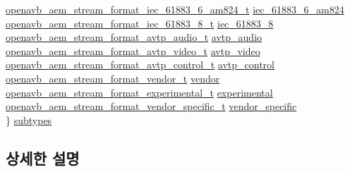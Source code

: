 \begin{DoxyCompactItemize}
\begin{tabbing}
\>\hyperlink{structopenavb__aem__stream__format__iec__61883__6__am824__t}{openavb\_aem\_stream\_format\_iec\_61883\_6\_am824\_t} \hyperlink{structopenavb__aem__stream__format__t_a6aeb7795fdcb65c756c3ccba977f1871}{iec\_61883\_6\_am824}\\
\>\hyperlink{structopenavb__aem__stream__format__iec__61883__8__t}{openavb\_aem\_stream\_format\_iec\_61883\_8\_t} \hyperlink{structopenavb__aem__stream__format__t_a5998a324f07307ce4d2f092b76ee670a}{iec\_61883\_8}\\
\>\hyperlink{structopenavb__aem__stream__format__avtp__audio__t}{openavb\_aem\_stream\_format\_avtp\_audio\_t} \hyperlink{structopenavb__aem__stream__format__t_a34c41241f596f9558c3bffc8598d2e00}{avtp\_audio}\\
\>\hyperlink{structopenavb__aem__stream__format__avtp__video__t}{openavb\_aem\_stream\_format\_avtp\_video\_t} \hyperlink{structopenavb__aem__stream__format__t_abd1432549c3dd07e3d987e44658f77bc}{avtp\_video}\\
\>\hyperlink{structopenavb__aem__stream__format__avtp__control__t}{openavb\_aem\_stream\_format\_avtp\_control\_t} \hyperlink{structopenavb__aem__stream__format__t_a37a91cf62d4d80f4fd05bc7b2a8c148a}{avtp\_control}\\
\>\hyperlink{structopenavb__aem__stream__format__vendor__t}{openavb\_aem\_stream\_format\_vendor\_t} \hyperlink{structopenavb__aem__stream__format__t_abe3fa7c528292c33e301ca728ad10258}{vendor}\\
\>\hyperlink{structopenavb__aem__stream__format__experimental__t}{openavb\_aem\_stream\_format\_experimental\_t} \hyperlink{structopenavb__aem__stream__format__t_a7d40af42829b920922cd5b33b5051f61}{experimental}\\
\>\hyperlink{structopenavb__aem__stream__format__vendor__specific__t}{openavb\_aem\_stream\_format\_vendor\_specific\_t} \hyperlink{structopenavb__aem__stream__format__t_aab4b01b1214d2048a1a5bd2ac6d02bbb}{vendor\_specific}\\
\} \hyperlink{structopenavb__aem__stream__format__t_a60d871495d63d5432b2e655d6eb81fce}{subtypes}\\

\end{tabbing}\end{DoxyCompactItemize}


\subsection{상세한 설명}


